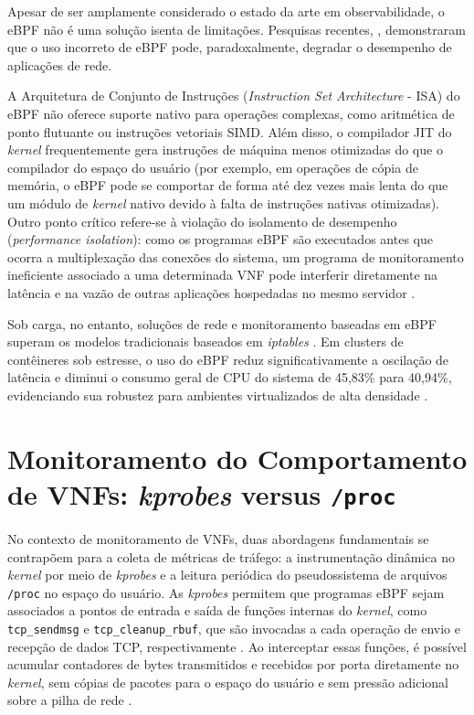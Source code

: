 Apesar de ser amplamente considerado o estado da arte em observabilidade, o eBPF não é uma solução isenta de limitações. Pesquisas recentes, \cite{shahinfar2025demystifying}, demonstraram que o uso incorreto de eBPF pode, paradoxalmente, degradar o desempenho de aplicações de rede.

A Arquitetura de Conjunto de Instruções (\textit{Instruction Set Architecture} - ISA) do eBPF não oferece suporte nativo para operações complexas, como aritmética de ponto flutuante ou instruções vetoriais SIMD. Além disso, o compilador JIT do \textit{kernel} frequentemente gera instruções de máquina menos otimizadas do que o compilador do espaço do usuário (por exemplo, em operações de cópia de memória, o eBPF pode se comportar de forma até dez vezes mais lenta do que um módulo de \textit{kernel} nativo devido à falta de instruções nativas otimizadas). Outro ponto crítico refere-se à violação do isolamento de desempenho (\textit{performance isolation}): como os programas eBPF são executados antes que ocorra a multiplexação das conexões do sistema, um programa de monitoramento ineficiente associado a uma determinada VNF pode interferir diretamente na latência e na vazão de outras aplicações hospedadas no mesmo servidor \cite{shahinfar2025demystifying}.

Sob carga, no entanto, soluções de rede e monitoramento baseadas em eBPF superam os modelos tradicionais baseados em \textit{iptables} \cite{mizinski2025impact}. Em clusters de contêineres sob estresse, o uso do eBPF reduz significativamente a oscilação de latência e diminui o consumo geral de CPU do sistema de 45,83\% para 40,94\%, evidenciando sua robustez para ambientes virtualizados de alta densidade \cite{mizinski2025impact}.

\section{Monitoramento do Comportamento de VNFs: \textit{kprobes} versus \texttt{/proc}}
\label{sec:kprobes_proc}

No contexto de monitoramento de VNFs, duas abordagens fundamentais se contrapõem para a coleta de métricas de tráfego: a instrumentação dinâmica no \textit{kernel} por meio de \textit{kprobes} e a leitura periódica do pseudossistema de arquivos \texttt{/proc} no espaço do usuário.
As \textit{kprobes} permitem que programas eBPF sejam associados a pontos de entrada e saída de funções internas do \textit{kernel}, como \texttt{tcp\_sendmsg} e \texttt{tcp\_cleanup\_rbuf}, que são invocadas a cada operação de envio e recepção de dados TCP, respectivamente \cite{gregg_bpf_2019}. Ao interceptar essas funções, é possível acumular contadores de bytes transmitidos e recebidos por porta diretamente no \textit{kernel}, sem cópias de pacotes para o espaço do usuário e sem pressão adicional sobre a pilha de rede \cite{10.1109/NOMS47738.2020.9110434}.

